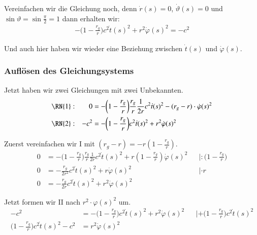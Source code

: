 \begin{refsection}
\noindent{}Vereinfachen wir die Gleichung noch, denn \( \dot r(s) = 0 \), \( \dot \vartheta(s) = 0 \) und \( \sin \vartheta = \sin \frac{\pi}{2} = 1 \) dann erhalten wir:
\begin{align*}
-\biggl(1-\frac{r_g}r\biggr)c^2 \dot t(s)^2 + r^2  \dot \varphi (s)^2 = -c^2 
\end{align*}

\noindent{}Und auch hier haben wir wieder eine Beziehung zwischen \( \dot t(s) \) und \( \dot \varphi(s) \). 

\subsubsection{Auflösen des Gleichungsystems}
Jetzt haben wir zwei Gleichungen mit zwei Unbekannten.
\begin{align*}
\RN{1}: &&
0 &= -\biggl(1-\frac{r_g}{r}\biggr)\frac{r_g}{r}\frac1{2r}c^2\dot t(s)^2 - (r_g-r)\cdot \dot \varphi(s)^2
\\
\RN{2}: &&
-c^2  &= -\biggl(1-\frac{r_g}r\biggr)c^2 \dot t(s)^2 + r^2  \dot \varphi (s)^2
\end{align*}

\noindent{}Zuerst vereinfachen wir \RN{1} mit $ (r_g - r) = -r (1 - \frac{r_g}{r} )$.
\begin{align*}
0 &= -\biggl(1-\frac{r_g}{r}\biggr)\frac{r_g}{r}\frac1{2r}c^2\dot t(s)^2 + r (1 - \frac{r_g}{r} ) \dot \varphi(s)^2 && | : \biggr( 1 - \frac{r_g}{r} \biggr)
\\
0 &= -\frac{r_g}{2r^2} c^2 \dot t(s)^2 + r \dot \varphi(s)^2 && | \cdot r
\\
0 &= -\frac{r_g}{2r} c^2 \dot t(s)^2 + r^2 \dot \varphi(s)^2
\end{align*}

\noindent{}Jetzt formen wir \RN{2} nach $ r^2 \cdot \varphi(s)^2$ um.
\begin{align*}
-c^2  &= -\biggl(1-\frac{r_g}r\biggr)c^2 \dot t(s)^2 + r^2  \dot \varphi (s)^2 && | + \biggr( 1 - \frac{r_g}{r} \biggr) c^2 \dot t(s)^2
\\
\biggr( 1 - \frac{r_g}{r} \biggr) c^2 \dot t(s)^2 - c^2 &=  r^2  \dot \varphi (s)^2
\end{align*}


\end{refsection}
